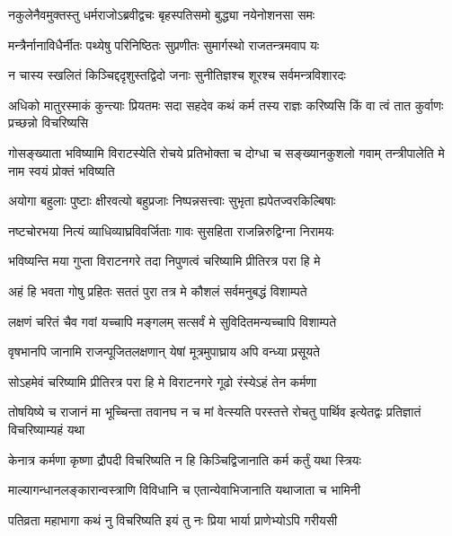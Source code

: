 
\twolineshloka
{नकुलेनैवमुक्तस्तु धर्मराजोऽब्रवीद्वचः}
{बृहस्पतिसमो बुद्ध्या नयेनोशनसा समः}


\twolineshloka
{मन्त्रैर्नानाविधैर्नीतः पथ्येषु परिनिष्ठितः}
{सुप्रणीतः सुमार्गस्थो राजतन्त्रमवाप यः}


\twolineshloka
{न चास्य स्खलितं किञ्चिद्ददृशुस्तद्विदो जनाः}
{सुनीतिज्ञश्च शूरश्च सर्वमन्त्रविशारदः}


\threelineshloka
{अधिको मातुरस्माकं कुन्त्याः प्रियतमः सदा}
{सहदेव कथं कर्म तस्य राज्ञः करिष्यसि}
{किं वा त्वं तात कुर्वाणः प्रच्छन्नो विचरिष्यसि}




\threelineshloka
{गोसङ्ख्याता भविष्यामि विराटस्येति रोचये}
{प्रतिभोक्ता च दोग्धा च सङ्ख्यानकुशलो गवाम्}
{तन्त्रीपालेति मे नाम स्वयं प्रोक्तं भविष्यति}


\twolineshloka
{अयोगा बहुलाः पुष्टाः क्षीरवत्यो बहुप्रजाः}
{निष्पन्नसत्त्वाः सुभृता ह्यपेतज्वरकिल्बिषाः}


\twolineshloka
{नष्टचोरभया नित्यं व्याधिव्याघ्रविवर्जिताः}
{गावः सुसहिता राजन्निरुद्विग्ना निरामयः}


\twolineshloka
{भविष्यन्ति मया गुप्ता विराटनगरे तदा}
{निपुणत्वं चरिष्यामि प्रीतिरत्र परा हि मे}


\twolineshloka
{अहं हि भवता गोषु प्रहितः सततं पुरा}
{तत्र मे कौशलं सर्वमनुबद्धं विशाम्पते}


\twolineshloka
{लक्षणं चरितं चैव गवां यच्चापि मङ्गलम्}
{सत्सर्वं मे सुविदितमन्यच्चापि विशाम्पते}


\twolineshloka
{वृषभानपि जानामि राजन्पूजितलक्षणान्}
{येषां मूत्रमुपाघ्राय अपि वन्ध्या प्रसूयते}


\twolineshloka
{सोऽहमेवं चरिष्यामि प्रीतिरत्र परा हि मे}
{विराटनगरे गूढो रंस्येऽहं तेन कर्मणा}


\threelineshloka
{तोषयिष्ये च राजानं मा भूच्चिन्ता तवानघ}
{न च मां वेत्स्यति परस्तत्ते रोचतु पार्थिव}
{इत्येतद्वः प्रतिज्ञातं विचरिष्याम्यहं यथा}




\twolineshloka
{केनात्र कर्मणा कृष्णा द्रौपदी विचरिष्यति}
{न हि किञ्चिद्विजानाति कर्म कर्तुं यथा स्त्रियः}


\twolineshloka
{माल्यागन्धानलङ्कारान्वस्त्राणि विविधानि च}
{एतान्येवाभिजानाति यथाजाता च भामिनी}


\twolineshloka
{पतिव्रता महाभागा कथं नु विचरिष्यति}
{इयं तु नः प्रिया भार्या प्राणेभ्योऽपि गरीयसी}


